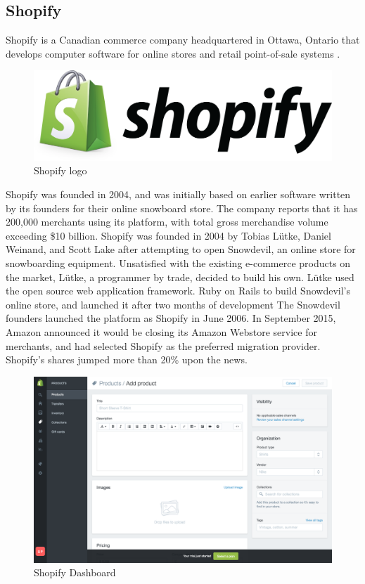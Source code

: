 \subsection{Shopify}
Shopify is a Canadian commerce company headquartered in Ottawa, Ontario that develops computer software for online stores and retail point-of-sale systems \cite{shopify_overview}.
\begin{figure}[htb]
  \centering
  \includegraphics[width=0.5\linewidth]{images/chapter1/shopify_logo.png}\hfill
  \caption[Shopify logo]{Shopify logo}
  \label{fig:ebay_logo}
\end{figure}
Shopify was founded in 2004, and was initially based on earlier software written by its founders for their online snowboard store. The company reports that it has 200,000 merchants using its platform, with total gross merchandise volume exceeding \$10 billion.
\newline
Shopify was founded in 2004 by Tobias Lütke, Daniel Weinand, and Scott Lake after attempting to open Snowdevil, an online store for snowboarding equipment. Unsatisfied with the existing e-commerce products on the market, Lütke, a programmer by trade, decided to build his own.
Lütke used the open source web application framework. Ruby on Rails to build Snowdevil's online store, and launched it after two months of development The Snowdevil founders launched the platform as Shopify in June 2006.
In September 2015, Amazon announced it would be closing its Amazon Webstore service for merchants, and had selected Shopify as the preferred migration provider. Shopify's shares jumped more than 20\% upon the news.
\begin{figure}[htb]
 \centering
 \includegraphics[width=1.0\linewidth]{images/chapter1/ex-shopify.png}\hfill
 \caption[Shopify Dashboard]{Shopify Dashboard}
 \label{fig:shopify_dashboard}
\end{figure}
